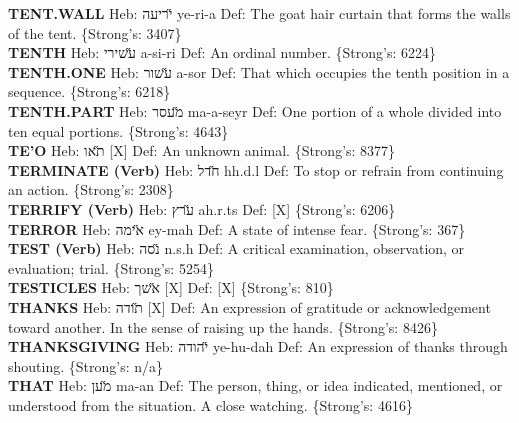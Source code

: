 {\textbf{TENT.WALL} Heb: {\large\H יריעה} ye-ri-a Def: The goat hair curtain that forms the walls of the tent. \{Strong's: 3407\}\hfill{}\\

\textbf{TENTH} Heb: {\large\H עשירי} a-si-ri Def: An ordinal number. \{Strong's: 6224\}\hfill{}\\

\textbf{TENTH.ONE} Heb: {\large\H עשור} a-sor Def: That which occupies the tenth position in a sequence. \{Strong's: 6218\}\hfill{}\\

\textbf{TENTH.PART} Heb: {\large\H מעסר} ma-a-seyr Def: One portion of a whole divided into ten equal portions. \{Strong's: 4643\}\hfill{}\\

\textbf{TE'O} Heb: {\large\H תאו} {[}X{]} Def: An unknown animal. \{Strong's: 8377\}\hfill{}\\

\textbf{TERMINATE (Verb)} Heb: {\large\H חדל} hh.d.l Def: To stop or refrain from continuing an action. \{Strong's: 2308\}\hfill{}\\

\textbf{TERRIFY (Verb)} Heb: {\large\H ערץ} ah.r.ts Def: {[}X{]} \{Strong's: 6206\}\hfill{}\\

\textbf{TERROR} Heb: {\large\H אימה} ey-mah Def: A state of intense fear. \{Strong's: 367\}\hfill{}\\

\textbf{TEST (Verb)} Heb: {\large\H נסה} n.s.h Def: A critical examination, observation, or evaluation; trial. \{Strong's: 5254\}\hfill{}\\

\textbf{TESTICLES} Heb: {\large\H אשך} {[}X{]} Def: {[}X{]} \{Strong's: 810\}\hfill{}\\

\textbf{THANKS} Heb: {\large\H תודה} {[}X{]} Def: An expression of gratitude or acknowledgement toward another. In the sense of raising up the hands. \{Strong's: 8426\}\hfill{}\\

\textbf{THANKSGIVING} Heb: {\large\H יהודה} ye-hu-dah Def: An expression of thanks through shouting. \{Strong's: n/a\}\hfill{}\\

\textbf{THAT} Heb: {\large\H מען} ma-an Def: The person, thing, or idea indicated, mentioned, or understood from the situation. A close watching. \{Strong's: 4616\}\hfill{}\\

}
